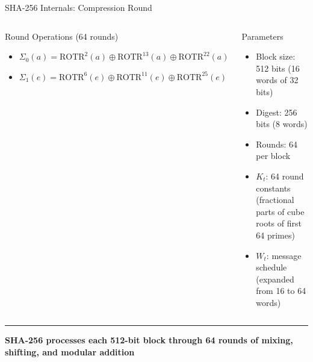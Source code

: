\documentclass[8pt,aspectratio=169]{beamer}
\newcommand{\bottomnote}[1]{\vfill\vspace{-2mm}\textcolor{mllavender2}{\rule{\textwidth}{0.4pt}}\vspace{1mm}\footnotesize\textbf{#1}}
\begin{document}
\begin{frame}{SHA-256 Internals: Compression Round}
\begin{columns}
\begin{block}{Round Operations (64 rounds)}
\begin{itemize}
  \item $\Sigma_0(a) = \text{ROTR}^2(a) \oplus \text{ROTR}^{13}(a) \oplus \text{ROTR}^{22}(a)$
  \item $\Sigma_1(e) = \text{ROTR}^6(e) \oplus \text{ROTR}^{11}(e) \oplus \text{ROTR}^{25}(e)$
\end{itemize}
\end{block}
\begin{block}{Parameters}
\begin{itemize}\scriptsize
  \item Block size: 512 bits (16 words of 32 bits)
  \item Digest: 256 bits (8 words)
  \item Rounds: 64 per block
  \item $K_t$: 64 round constants (fractional parts of cube roots of first 64 primes)
  \item $W_t$: message schedule (expanded from 16 to 64 words)
\end{itemize}
\end{block}
\end{columns}
\bottomnote{SHA-256 processes each 512-bit block through 64 rounds of mixing, shifting, and modular addition}
\end{frame}
\end{document}
